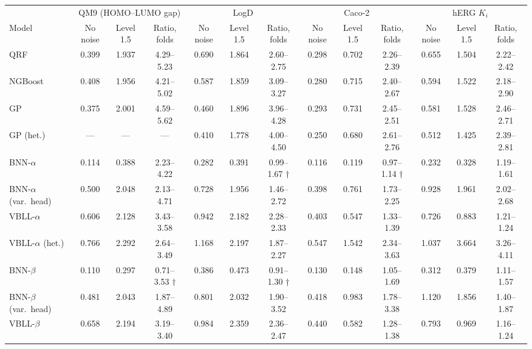 \begin{table}[!htbp]
\centering
\small
\begin{adjustbox}{max width=\textwidth,max totalheight=0.78\textheight}
\begin{tabular}{lcccccccccccc}
\toprule
& \multicolumn{3}{c}{QM9 (HOMO--LUMO gap)} & \multicolumn{3}{c}{LogD} & \multicolumn{3}{c}{Caco-2} & \multicolumn{3}{c}{hERG $K_i$} \\
\cmidrule(lr){2-4} \cmidrule(lr){5-7} \cmidrule(lr){8-10} \cmidrule(lr){11-13}
Model & No noise & Level 1.5 & Ratio, folds & No noise & Level 1.5 & Ratio, folds & No noise & Level 1.5 & Ratio, folds & No noise & Level 1.5 & Ratio, folds \\
\midrule
QRF & 0.399 & 1.937 & 4.29--5.23 & 0.690 & 1.864 & 2.60--2.75 & 0.298 & 0.702 & 2.26--2.39 & 0.655 & 1.504 & 2.22--2.42 \\
NGBoost & 0.408 & 1.956 & 4.21--5.02 & 0.587 & 1.859 & 3.09--3.27 & 0.280 & 0.715 & 2.40--2.67 & 0.594 & 1.522 & 2.18--2.90 \\
GP & 0.375 & 2.001 & 4.59--5.62 & 0.460 & 1.896 & 3.96--4.28 & 0.293 & 0.731 & 2.45--2.51 & 0.581 & 1.528 & 2.46--2.71 \\
GP (het.) & --- & --- & --- & 0.410 & 1.778 & 4.00--4.50 & 0.250 & 0.680 & 2.61--2.76 & 0.512 & 1.425 & 2.39--2.81 \\
BNN-$\alpha$ & 0.114 & 0.388 & 2.23--4.22 & 0.282 & 0.391 & 0.99--1.67 $\dagger$ & 0.116 & 0.119 & 0.97--1.14 $\dagger$ & 0.232 & 0.328 & 1.19--1.61 \\
BNN-$\alpha$ (var.\ head) & 0.500 & 2.048 & 2.13--4.71 & 0.728 & 1.956 & 1.46--2.72 & 0.398 & 0.761 & 1.73--2.25 & 0.928 & 1.961 & 2.02--2.68 \\
VBLL-$\alpha$ & 0.606 & 2.128 & 3.43--3.58 & 0.942 & 2.182 & 2.28--2.33 & 0.403 & 0.547 & 1.33--1.39 & 0.726 & 0.883 & 1.21--1.24 \\
VBLL-$\alpha$ (het.) & 0.766 & 2.292 & 2.64--3.49 & 1.168 & 2.197 & 1.87--2.27 & 0.547 & 1.542 & 2.34--3.63 & 1.037 & 3.664 & 3.26--4.11 \\
BNN-$\beta$ & 0.110 & 0.297 & 0.71--3.53 $\dagger$ & 0.386 & 0.473 & 0.91--1.30 $\dagger$ & 0.130 & 0.148 & 1.05--1.69 & 0.312 & 0.379 & 1.11--1.57 \\
BNN-$\beta$ (var.\ head) & 0.481 & 2.043 & 1.87--4.89 & 0.801 & 2.032 & 1.90--3.52 & 0.418 & 0.983 & 1.78--3.38 & 1.120 & 1.856 & 1.40--1.87 \\
VBLL-$\beta$ & 0.658 & 2.194 & 3.19--3.40 & 0.984 & 2.359 & 2.36--2.47 & 0.440 & 0.582 & 1.28--1.38 & 0.793 & 0.969 & 1.16--1.24 \\

\end{tabular}
\end{adjustbox}
\end{table}
